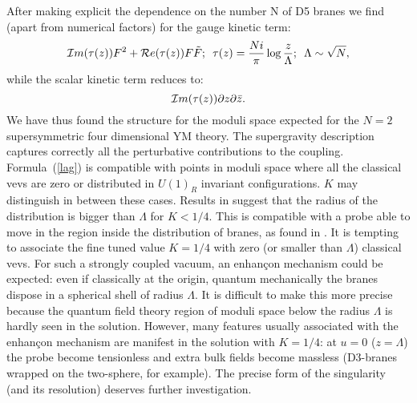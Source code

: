 \documentclass[a4paper,12pt]{article}
\begin{document}
After making explicit the dependence on the number N of D5 branes we find (apart from numerical factors) for the gauge kinetic term:
\begin{equation}
 {\cal I}m(\tau(z))F^2+{\cal R}e(\tau(z))F\tilde{F};\,\,\, \tau(z)={Ni\over \pi}\log {z\over\Lambda};\,\,\, \Lambda\sim{\sqrt N},
\label{lag}\end{equation}
while the scalar kinetic term reduces to:
\begin{equation}
{\cal I}m(\tau(z))\partial z\partial \bar{z}.
\end{equation}
We have thus found the structure for the moduli space expected for the $N=2$
supersymmetric four dimensional YM theory. The supergravity description captures correctly all the perturbative contributions to the coupling. 
Formula~(\ref{lag}) is compatible with points in moduli space where
all the classical vevs are zero or distributed in $U(1)_R$ invariant
configurations. $K$ may distinguish in between these cases.
Results in \cite{martelli} suggest that the radius of the
distribution is bigger than $\Lambda$ for $K<1/4$. This is compatible
with a probe able to move in the region inside the distribution
of branes, as found in \cite{martelli}.    
It is tempting to associate the fine tuned value $K=1/4$ with zero
(or smaller than $\Lambda$) classical vevs. 
For such a strongly coupled vacuum, an
enhan\c con mechanism \cite{jpp} could be expected: 
even if classically at the
origin, quantum mechanically the branes dispose in a spherical shell
of radius $\Lambda$. It is difficult to make this more precise because
the quantum field theory region of moduli space 
below the radius $\Lambda$ is hardly seen in the solution.
However, many features usually associated with the enhan\c con mechanism
are manifest in the solution with $K=1/4$:  at $u=0$ ($z=\Lambda$)
the probe become tensionless and extra bulk fields
become massless (D3-branes wrapped on the two-sphere, for example).
 The precise form of the singularity (and its resolution)
deserves further investigation. 
\end{document}
